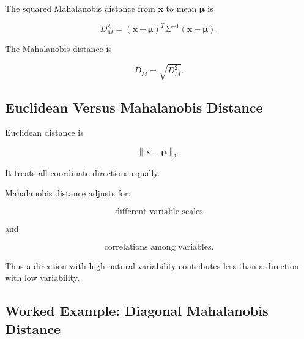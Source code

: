 The squared Mahalanobis distance from \(\mathbf{x}\) to mean
\(\boldsymbol{\mu}\) is

\[
\boxed{
D_M^2
=
(
\mathbf{x}-\boldsymbol{\mu}
)^T
\Sigma^{-1}
(
\mathbf{x}-\boldsymbol{\mu}
).
}
\]

The Mahalanobis distance is

\[
\boxed{
D_M
=
\sqrt{
D_M^2
}.
}
\]

\subsection{Euclidean Versus Mahalanobis Distance}
\label{subsec:euclidean-versus-mahalanobis}

Euclidean distance is

\[
\boxed{
\|\mathbf{x}-\boldsymbol{\mu}\|_2.
}
\]

It treats all coordinate directions equally.

Mahalanobis distance adjusts for:

\[
\boxed{
\text{different variable scales}
}
\]

and

\[
\boxed{
\text{correlations among variables}.
}
\]

Thus a direction with high natural variability contributes less than a
direction with low variability.

\subsection{Worked Example: Diagonal Mahalanobis Distance}
\label{subsec:worked-mahalanobis-distance}


